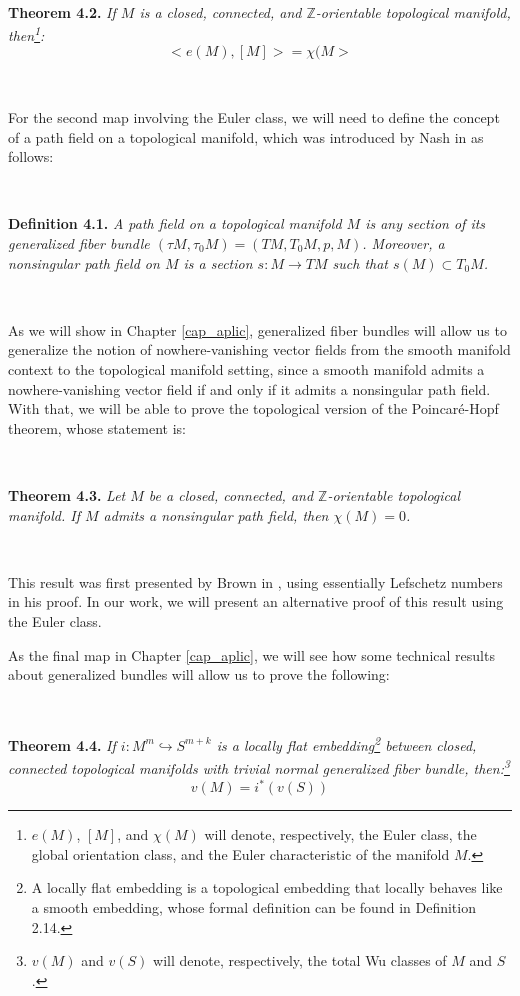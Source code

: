 \documentclass[12pt,oneside]{book}
\newcommand{\Z}{\mathbb{Z}}
\begin{document}
    \

    \textbf{Theorem 4.2. }\textit{If $M$ is a closed, connected, and $\Z$-orientable topological 
    manifold, then\footnote{$e(M)$, $[M]$, and $\chi(M)$ will denote, respectively, the Euler class, 
    the global orientation class, and the Euler characteristic of the manifold $M$.}:
    $$ <e(M),[M]>=\chi(M> $$}

    \

    For the second map involving the Euler class, we will need to define the concept of a path field on 
    a topological manifold, which was introduced by Nash in \cite{nash} as follows:
    
    \

    \textbf{Definition 4.1. }\textit{A path field on a topological manifold $M$ is any section of its 
    generalized fiber bundle $(\tau M,\tau_{0}M)=(TM,T_{0}M,p,M)$. Moreover, a nonsingular path field on $M$ 
    is a section $s:M\to TM$ such that $s(M)\subset T_{0}M$.}

    \

    As we will show in Chapter \ref{cap_aplic}, generalized fiber bundles will allow us to generalize the 
    notion of nowhere-vanishing vector fields from the smooth manifold context to the topological 
    manifold setting, since a smooth manifold admits a nowhere-vanishing vector field if and only if it 
    admits a nonsingular path field. With that, we will be able to prove the topological version of the 
    Poincaré-Hopf theorem, whose statement is:

    \

    \textbf{Theorem 4.3. }\textit{Let $M$ be a closed, connected, and $\Z$-orientable topological 
    manifold. If $M$ admits a nonsingular path field, then $\chi(M)=0$.}

    \

    This result was first presented by Brown in \cite{brown}, using essentially Lefschetz numbers in his 
    proof. In our work, we will present an alternative proof of this result using the Euler class.

    As the final map in Chapter \ref{cap_aplic}, we will see how some technical results about generalized 
    bundles will allow us to prove the following:

    \
    
    \textbf{Theorem 4.4. }\textit{If $i:M^{m}\hookrightarrow S^{m+k}$ is a locally flat 
    embedding\footnote{A locally flat embedding is a topological embedding that locally behaves like a 
    smooth embedding, whose formal definition can be found in Definition 2.14.} between closed, 
    connected topological manifolds with trivial normal generalized fiber bundle, then:\footnote{$v(M)$ and 
    $v(S)$ will denote, respectively, the total Wu classes of $M$ and $S$.}
    $$v(M)=i^{*}(v(S))$$}
\end{document}
